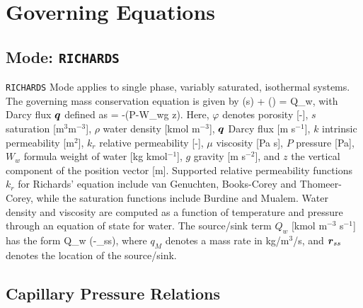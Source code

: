 \documentclass[12pt]{article}
\begin{document}

\section{Governing Equations}

\setcounter{equation}{0}

\subsection{Mode: {\tt RICHARDS}}

{\tt RICHARDS} Mode applies to single phase, variably saturated, isothermal systems. The governing mass conservation equation is given by
\EQ
{}\left(\varphi s\rho\right) + \bnabla\cdot\left(\rho\bq\right) = Q_w,
\EN
with Darcy flux $\boldsymbol{q}$ defined as
\EQ
\bq = -\bnabla\left(P-W_w\rho g z\right).
\EN
Here, $\varphi$ denotes porosity [-], 
$s$ saturation [m$^3$m$^{-3}$], 
$\rho$ water density [kmol m$^{-3}$], 
$\boldsymbol{q}$ Darcy flux [m s$^{-1}$], 
$k$ intrinsic permeability [m$^2$], 
$k_r$ relative permeability [-], 
$\mu$ viscosity [Pa s], 
$P$ pressure [Pa], 
$W_w$ formula weight of water [kg kmol$^{-1}$], 
$g$ gravity [m s$^{-2}$], and 
$z$ the vertical component of the position vector [m].  
Supported relative permeability functions $k_r$ for Richards' equation include van Genuchten, Books-Corey and Thomeer-Corey, while the saturation functions include Burdine and Mualem.  Water density and viscosity are computed as a function of temperature and pressure through an equation of state for water. The source/sink term $Q_w$ [kmol m$^{-3}$ s$^{-1}$] has the form
\EQ
Q_w \eq {} \delta(\br-\br_{ss}),
\EN
where $q_M$ denotes a mass rate in kg/m$^{3}$/s, and $\boldsymbol{r}_{ss}$ denotes the location of the source/sink.

\subsection{Capillary Pressure Relations}
\end{document}
